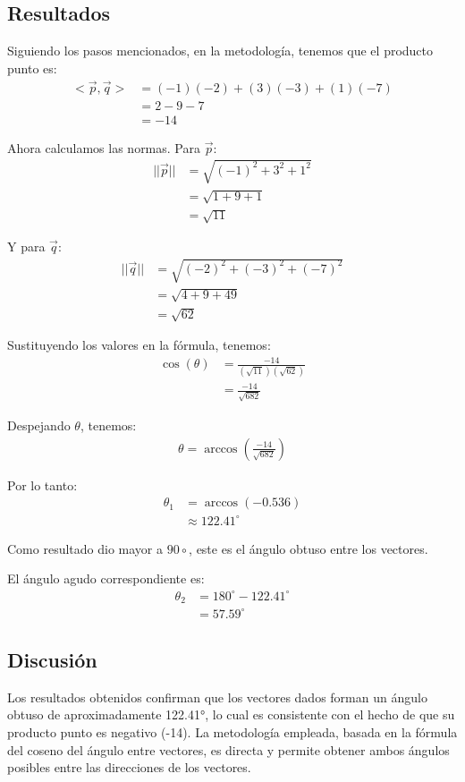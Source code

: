 \documentclass{article}
\begin{document}
\subsection{Resultados}
\setcounter{equation}{0}

Siguiendo los pasos mencionados, en la metodología, tenemos que el producto punto es:
\begin{align}
<\vec{p},\vec{q}> &= (-1)(-2) + (3)(-3) + (1)(-7) \\
&= 2 - 9 - 7 \\
&= -14
\end{align}

Ahora calculamos las normas.
Para $\vec{p}$:
\begin{align}
||\vec{p}|| &= \sqrt{(-1)^2 + 3^2 + 1^2} \\
&= \sqrt{1 + 9 + 1} \\
&= \sqrt{11}
\end{align}

Y para $\vec{q}$:
\begin{align}
||\vec{q}|| &= \sqrt{(-2)^2 + (-3)^2 + (-7)^2} \\
&= \sqrt{4 + 9 + 49} \\
&= \sqrt{62}
\end{align}

Sustituyendo los valores en la fórmula, tenemos:
\begin{align}
\cos(\theta) &= \frac{-14}{(\sqrt{11}) (\sqrt{62})} \\
&= \frac{-14}{\sqrt{682}} 
\end{align}

Despejando $\theta$, tenemos:
\begin{align}
\theta = \arccos(\frac{-14}{\sqrt{682}}) 
\end{align}

Por lo tanto:
\begin{align}
\theta_1 &= \arccos(-0.536) \\
&\approx 122.41^\circ
\end{align}

Como resultado dio mayor a $90\circ$, este es el ángulo obtuso entre los vectores.

El ángulo agudo correspondiente es:
\begin{align}
\theta_2 &= 180^\circ - 122.41^\circ \\
&= 57.59^\circ
\end{align}

\subsection{Discusión}
Los resultados obtenidos confirman que los vectores dados forman un ángulo obtuso de aproximadamente 122.41°, lo cual es consistente con el hecho de que su producto punto es negativo (-14). La metodología empleada, basada en la fórmula del coseno del ángulo entre vectores, es directa y permite obtener ambos ángulos posibles entre las direcciones de los vectores.
\end{document}
